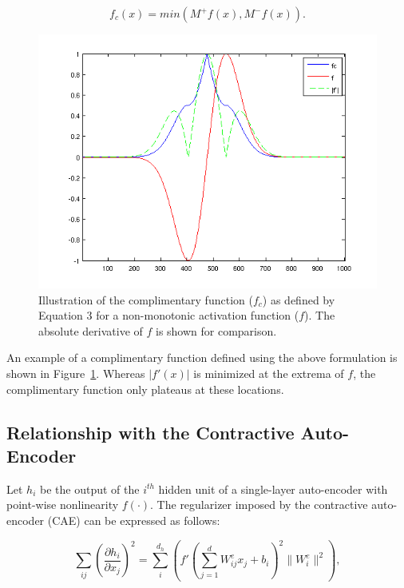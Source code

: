 \begin{equation} f_c(x) = min(M^+f(x),M^-f(x)).  \end{equation} 

\begin{figure} \centering \includegraphics[scale=0.43]{./figures/SATAE/diff_cc.png}
\caption{Illustration of the complimentary function ($f_c$) as defined by
Equation 3 for a non-monotonic activation function ($f$). The absolute
derivative of $f$ is shown for comparison.}  \label{fig:diff_cc} \end{figure} 

An example of a complimentary function defined using the above formulation is
shown in Figure~\ref{fig:diff_cc}. Whereas $|f'(x)|$ is minimized at the
extrema of $f$, the complimentary function only plateaus at these locations.

\subsection{Relationship with the Contractive Auto-Encoder} Let $h_i$ be the
output of the $i^{th}$ hidden unit of a single-layer auto-encoder with
point-wise nonlinearity $f(\cdot)$. The regularizer imposed by the contractive
auto-encoder (CAE) can be expressed as follows: 

\begin{equation} \nonumber \sum_{ij} \left(\frac{\partial h_i}{\partial x_j}
\right)^2 = \sum_i ^{d_h} \left(f'(\sum_{j=1}^d W^e_{ij}x_j + b_i)^2 \| W^e_i
\| ^2 \right), \end{equation}  
 
